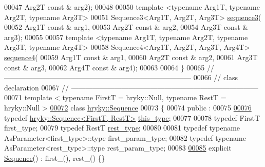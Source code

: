 \begin{DoxyCode}
00047         Arg2T \textcolor{keyword}{const} & arg2);
00048 
00050     \textcolor{keyword}{template} <\textcolor{keyword}{typename} Arg1T, \textcolor{keyword}{typename} Arg2T, \textcolor{keyword}{typename} Arg3T>
00051     Sequence3<Arg1T, Arg2T, Arg3T> \hyperlink{namespacehryky_a1e9f18a60e3a0425ac6d6496219b35c8}{sequence3}(
00052         Arg1T \textcolor{keyword}{const} & arg1,
00053         Arg2T \textcolor{keyword}{const} & arg2,
00054         Arg3T \textcolor{keyword}{const} & arg3);
00055 
00057     \textcolor{keyword}{template} <\textcolor{keyword}{typename} Arg1T, \textcolor{keyword}{typename} Arg2T, \textcolor{keyword}{typename} Arg3T, \textcolor{keyword}{typename} Arg4T>
00058     Sequence4<Arg1T, Arg2T, Arg3T, Arg4T> \hyperlink{namespacehryky_a2107ad509c2a26ac350cb1d10ad6c453}{sequence4}(
00059         Arg1T \textcolor{keyword}{const} & arg1,
00060         Arg2T \textcolor{keyword}{const} & arg2,
00061         Arg3T \textcolor{keyword}{const} & arg3,
00062         Arg4T \textcolor{keyword}{const} & arg4);
00063 
00064 \}
00065 \textcolor{comment}{//
      ------------------------------------------------------------------------------}
00066 \textcolor{comment}{// class declaration}
00067 \textcolor{comment}{//
      ------------------------------------------------------------------------------}
00071 \textcolor{comment}{}\textcolor{keyword}{template} < \textcolor{keyword}{typename} FirstT = hryky::Null, \textcolor{keyword}{typename} RestT = hryky::Null >
\hypertarget{sequence_8h_source_l00072}{}\hyperlink{classhryky_1_1_sequence}{00072} \textcolor{keyword}{class }\hyperlink{classhryky_1_1_sequence}{hryky::Sequence}
00073 \{
00074 \textcolor{keyword}{public} :
00075     
\hypertarget{sequence_8h_source_l00076}{}\hyperlink{classhryky_1_1_sequence_a704472ea381b81a30c2412c5a8d49074}{00076}     \textcolor{keyword}{typedef} \hyperlink{classhryky_1_1_sequence}{hryky::Sequence<FirstT, RestT>}          \hyperlink{classhryky_1_1_sequence_a704472ea381b81a30c2412c5a8d49074}{this_type};
00077 
00078     \textcolor{keyword}{typedef} FirstT  first\_type;
00079     \textcolor{keyword}{typedef} RestT   \hyperlink{classhryky_1_1_sequence}{rest_type};
00080     
00081     \textcolor{keyword}{typedef} \textcolor{keyword}{typename} AsParameter<first\_type>::type  first\_param\_type;
00082     \textcolor{keyword}{typedef} \textcolor{keyword}{typename} AsParameter<rest\_type>::type   rest\_param\_type;
00083 
\hypertarget{sequence_8h_source_l00085}{}\hyperlink{classhryky_1_1_sequence_a562adf14504f2d6569dae23904f411fb}{00085}     \textcolor{keyword}{explicit} \hyperlink{classhryky_1_1_sequence_a562adf14504f2d6569dae23904f411fb}{Sequence}() : first\_(), rest\_() \{\}

\end{DoxyCode}
